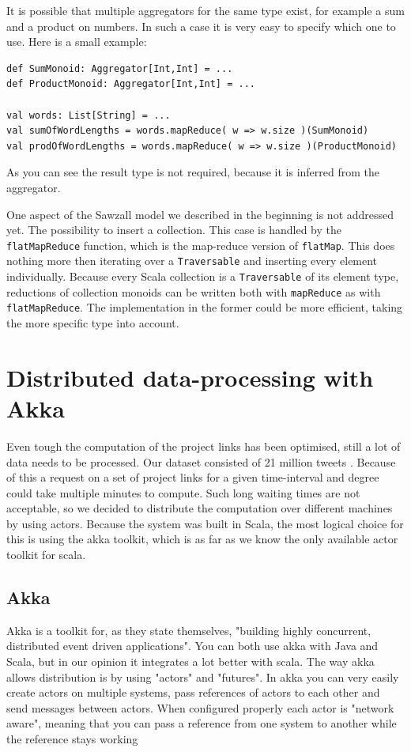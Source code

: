 \documentclass[10pt,a4paper]{article}
\begin{document}
It is possible that multiple aggregators for the same type exist, for example a sum and a product on numbers. In such a case it is very easy to specify which one to use. Here is a small example:
\begin{lstlisting}
def SumMonoid: Aggregator[Int,Int] = ...
def ProductMonoid: Aggregator[Int,Int] = ...

val words: List[String] = ...
val sumOfWordLengths = words.mapReduce( w => w.size )(SumMonoid)
val prodOfWordLengths = words.mapReduce( w => w.size )(ProductMonoid)
\end{lstlisting}
As you can see the result type is not required, because it is inferred from the aggregator.

One aspect of the Sawzall model we described in the beginning is not addressed yet. The possibility to insert a collection. This case is handled by the \lstinline|flatMapReduce| function, which is the map-reduce version of \lstinline|flatMap|. This does nothing more then iterating over a \lstinline|Traversable| and inserting every element individually. Because every Scala collection is a \lstinline|Traversable| of its element type, reductions of collection monoids can be written both with \lstinline|mapReduce| as with \lstinline|flatMapReduce|. The implementation in the former could be more efficient, taking the more specific type into account.

\section{Distributed data-processing with Akka}\label{sec:distributed}

Even tough the computation of the project links has been optimised, still a lot of data needs to be processed. Our dataset consisted of 21 million tweets . Because of this a request on a set of project links for a given time-interval and degree could take multiple minutes to compute. Such long waiting times are not acceptable, so we decided to distribute the computation over different machines by using actors. Because the system was built in Scala, the most logical choice for this is using the akka toolkit, which is as far as we know the only available actor toolkit for scala.

\subsection{Akka}

Akka is a toolkit for, as they state themselves, "building highly concurrent, distributed event driven applications". You can both use akka with Java and Scala, but in our opinion it integrates a lot better with scala. The way akka allows distribution is by using "actors" and "futures". In akka you can very easily create actors on multiple systems, pass references of actors to each other and send messages between actors. When configured properly each actor is "network aware", meaning that you can pass a reference from one system to another while the reference stays working
\end{document}
